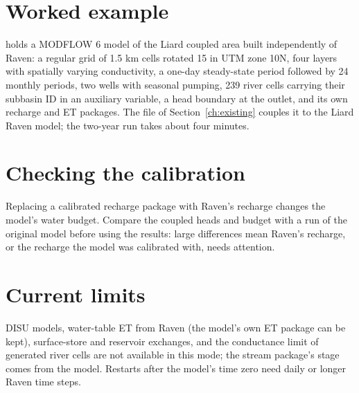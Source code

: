 \section{Worked example}
 holds a MODFLOW 6 model of the Liard coupled area built independently of Raven: a
regular grid of 1.5 km cells rotated 15\textdegree{} in UTM zone 10N, four layers with spatially varying conductivity,
a one-day steady-state period followed by 24 monthly periods, two wells with seasonal pumping, 239 river cells carrying
their subbasin ID in an auxiliary variable, a head boundary at the outlet, and its own recharge and ET packages. The 
file of Section~\ref{ch:existing} couples it to the Liard Raven model; the two-year run takes about four minutes.

\section{Checking the calibration}
Replacing a calibrated recharge package with Raven's recharge changes the model's water budget. Compare the coupled heads and
budget with a run of the original model before using the results: large differences mean Raven's recharge, or the
recharge the model was calibrated with, needs attention.

\section{Current limits}
DISU models, water-table ET from Raven (the model's own ET package can be kept), surface-store and reservoir exchanges, and
the conductance limit of generated river cells are not available in this mode; the stream package's stage comes from the
model. Restarts after the model's time zero need daily or longer Raven time steps.
